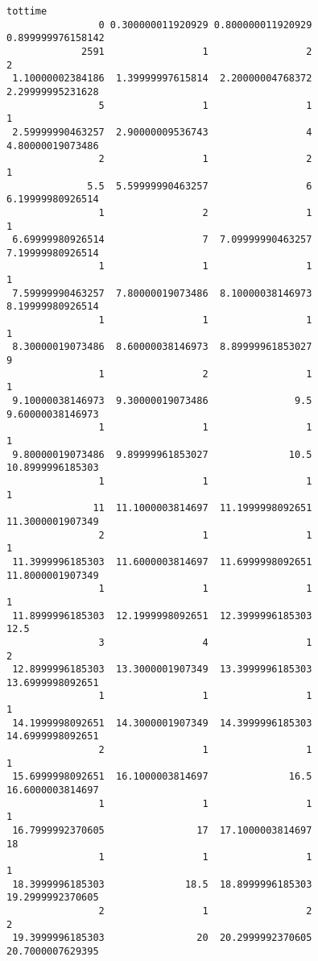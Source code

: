 \documentclass[
  letterpaper,
  DIV=11,
  numbers=noendperiod]{scrreprt}
\begin{document}
\begin{verbatim}
tottime
                0 0.300000011920929 0.800000011920929 0.899999976158142 
             2591                 1                 2                 2 
 1.10000002384186  1.39999997615814  2.20000004768372  2.29999995231628 
                5                 1                 1                 1 
 2.59999990463257  2.90000009536743                 4  4.80000019073486 
                2                 1                 2                 1 
              5.5  5.59999990463257                 6  6.19999980926514 
                1                 2                 1                 1 
 6.69999980926514                 7  7.09999990463257  7.19999980926514 
                1                 1                 1                 1 
 7.59999990463257  7.80000019073486  8.10000038146973  8.19999980926514 
                1                 1                 1                 1 
 8.30000019073486  8.60000038146973  8.89999961853027                 9 
                1                 2                 1                 1 
 9.10000038146973  9.30000019073486               9.5  9.60000038146973 
                1                 1                 1                 1 
 9.80000019073486  9.89999961853027              10.5  10.8999996185303 
                1                 1                 1                 1 
               11  11.1000003814697  11.1999998092651  11.3000001907349 
                2                 1                 1                 1 
 11.3999996185303  11.6000003814697  11.6999998092651  11.8000001907349 
                1                 1                 1                 1 
 11.8999996185303  12.1999998092651  12.3999996185303              12.5 
                3                 4                 1                 2 
 12.8999996185303  13.3000001907349  13.3999996185303  13.6999998092651 
                1                 1                 1                 1 
 14.1999998092651  14.3000001907349  14.3999996185303  14.6999998092651 
                2                 1                 1                 1 
 15.6999998092651  16.1000003814697              16.5  16.6000003814697 
                1                 1                 1                 1 
 16.7999992370605                17  17.1000003814697                18 
                1                 1                 1                 1 
 18.3999996185303              18.5  18.8999996185303  19.2999992370605 
                2                 1                 2                 2 
 19.3999996185303                20  20.2999992370605  20.7000007629395 

\end{verbatim}
\end{document}
